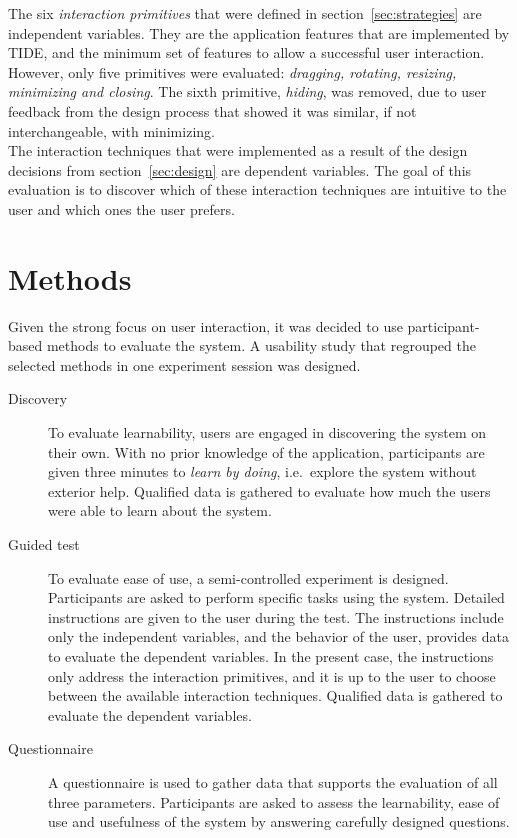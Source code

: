 The six \emph{interaction primitives} that were defined in section~\ref{sec:strategies} are independent variables.
They are the application features that are implemented by TIDE, and the minimum set of features to allow a successful user interaction.
However, only five primitives were evaluated: \emph{dragging, rotating, resizing, minimizing and closing}.
The sixth primitive, \emph{hiding}, was removed, due to user feedback from the design process that showed it was similar, if not interchangeable, with minimizing.
\\
\linebreak
The interaction techniques that were implemented as a result of the design decisions from section~\ref{sec:design} are dependent variables.
The goal of this evaluation is to discover which of these interaction techniques are intuitive to the user and which ones the user prefers. 


\section{Methods}
\label{sec:methods}

Given the strong focus on user interaction, it was decided to use participant-based methods to evaluate the system.
A usability study that regrouped the selected methods in one experiment session was designed.

\begin{description}

\item[Discovery]

To evaluate learnability, users are engaged in discovering the system on their own.
With no prior knowledge of the application, participants are given three minutes to \emph{learn by doing}, i.e.\ explore the system without exterior help.
Qualified data is gathered to evaluate how much the users were able to learn about the system.

\item[Guided test]

To evaluate ease of use, a semi-controlled experiment is designed.
Participants are asked to perform specific tasks using the system.
Detailed instructions are given to the user during the test.
The instructions include only the independent variables, and the behavior of the user, provides data to evaluate the dependent variables.
In the present case, the instructions only address the interaction primitives, and it is up to the user to choose between the available interaction techniques.
Qualified data is gathered to evaluate the dependent variables.

\item[Questionnaire]

A questionnaire is used to gather data that supports the evaluation of all three parameters.
Participants are asked to assess the learnability, ease of use and usefulness of the system by answering carefully designed questions.

\end{description}


